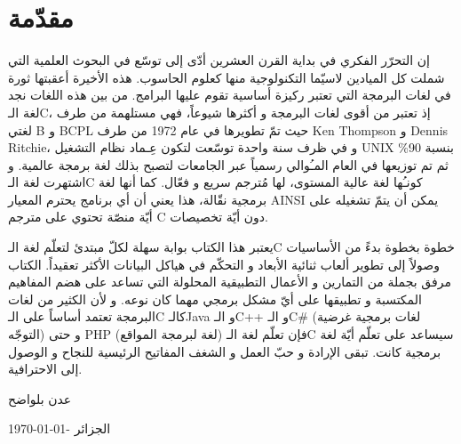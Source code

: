 \chapter*{مقدّمة}
إن التحرّر الفكري في بداية القرن العشرين أدّى إلى توسّع في البحوث العلمية التي شملت كل الميادين لاسيّما التكنولوجية منها كعلوم الحاسوب. هذه الأخيرة أعقبتها ثورة في لغات البرمجة التي تعتبر ركيزة أساسية تقوم عليها البرامج. من بين هذه اللغات نجد لغة الـ\textenglish{C}،
إذ تعتبر من أقوى لغات البرمجة و أكثرها شيوعاً، فهي مستلهمة من طرف لغتي
 \textenglish{B}
 و
 \textenglish{BCPL}
حيث تمّ تطويرها في عام 1972 من طرف
\textenglish{Ken Thompson}
و
 \textenglish{Dennis Ritchie}،
و في ظرف سنة واحدة توسّعت لتكون عِـماد نظام التشغيل
\textenglish{UNIX}
بنسبة
90\%
ثم تم توزيعها في العام المـُوالي رسمياً عبر الجامعات لتصبح بذلك لغة برمجة عالمية. و اشتهرت لغة الـ\textenglish{C}
 كونـُها لغة عالية المستوى، لها مُترجم سريع و فعّال. كما أنها لغة برمجية نقّالة، هذا يعني أن أي برنامج يحترم المعيار
\textenglish{AINSI}
يمكن أن يتمّ تشغيله على أيّة منصّة تحتوي على مترجم
\textenglish{C}
 دون أيّة تخصيصات.

يعتبر هذا الكتاب بوابة سهلة لكلّ مبتدئ لتعلّم لغة الـ\textenglish{C}
خطوة بخطوة بدءً من الأساسيات وصولاً إلى تطوير ألعاب ثنائية الأبعاد و التحكّم في هياكل البيانات الأكثر تعقيداً. الكتاب مرفق بجملة من التمارين و الأعمال التطبيقية المحلولة التي تساعد على هضم المفاهيم المكتسبة و تطبيقها على أيّ مشكل برمجي مهما كان نوعه. و لأن الكثير من لغات البرمجة تعتمد أساساً على الـ\textenglish{C}
كالـ\textenglish{Java}
و الـ\textenglish{C++}
و الـ\textenglish{C\#}
(لغات برمجية غرضية التوجّه) و حتى
\textenglish{PHP}
(لغة لبرمجة المواقع) فإن تعلّم لغة الـ\textenglish{C}
 سيساعد على تعلّم أيّة لغة برمجية كانت. تبقى الإرادة و حبّ العمل و الشغف المفاتيح الرئيسية للنجاح و الوصول إلى الاحترافية.

\vspace{3em}
\hfill عدن بلواضح

\hfill \today - الجزائر

